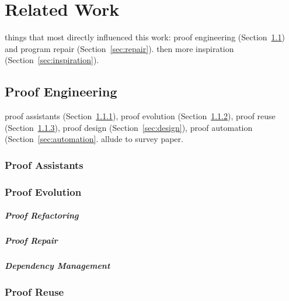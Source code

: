 \chapter{Related Work}
\label{sec:related}


things that most directly influenced this work:
proof engineering (Section~\ref{sec:proofeng}) and program repair (Section~\ref{sec:repair}).
then more inspiration (Section~\ref{sec:inspiration}).

\section{Proof Engineering}
\label{sec:proofeng}

proof assistants (Section~\ref{sec:ass}),
proof evolution (Section~\ref{sec:refrep}),
proof reuse (Section~\ref{sec:reuse}),
proof design (Section~\ref{sec:design}),
proof automation (Section~\ref{sec:automation}.
allude to survey paper.

\subsection{Proof Assistants}
\label{sec:ass}


\subsection{Proof Evolution}
\label{sec:refrep}

\paragraph{Proof Refactoring}

\paragraph{Proof Repair}

\paragraph{Dependency Management}

\subsection{Proof Reuse}
\label{sec:reuse}

